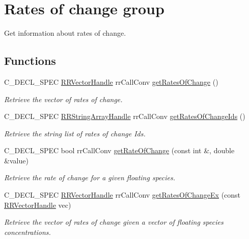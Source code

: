 \hypertarget{group__rate_of_change}{
\section{\-Rates of change group}
\label{group__rate_of_change}
}


\-Get information about rates of change.  


\subsection*{\-Functions}
\begin{DoxyCompactItemize}
\item 
\-C\-\_\-\-D\-E\-C\-L\-\_\-\-S\-P\-E\-C \hyperlink{rr__c__types_8h_aea46a16752b0ae2cd95c009030ee630e}{\-R\-R\-Vector\-Handle} \*
rr\-Call\-Conv \hyperlink{group__rate_of_change_gabbe129bee63761f7b0f98f060b86067b}{get\-Rates\-Of\-Change} ()
\begin{DoxyCompactList}\small\item\em \-Retrieve the vector of rates of change. \end{DoxyCompactList}\item 
\-C\-\_\-\-D\-E\-C\-L\-\_\-\-S\-P\-E\-C \*
\hyperlink{rr__c__types_8h_a90941a6a2247bf7a8ec3d429729c5f9a}{\-R\-R\-String\-Array\-Handle} rr\-Call\-Conv \hyperlink{group__rate_of_change_ga1a87e2a6db4adb19a11a6a893eca74d8}{get\-Rates\-Of\-Change\-Ids} ()
\begin{DoxyCompactList}\small\item\em \-Retrieve the string list of rates of change \-Ids. \end{DoxyCompactList}\item 
\-C\-\_\-\-D\-E\-C\-L\-\_\-\-S\-P\-E\-C bool rr\-Call\-Conv \hyperlink{group__rate_of_change_gaad38321993112e230f7fccd96345de6c}{get\-Rate\-Of\-Change} (const int \&, double \&value)
\begin{DoxyCompactList}\small\item\em \-Retrieve the rate of change for a given floating species. \end{DoxyCompactList}\item 
\-C\-\_\-\-D\-E\-C\-L\-\_\-\-S\-P\-E\-C \hyperlink{rr__c__types_8h_aea46a16752b0ae2cd95c009030ee630e}{\-R\-R\-Vector\-Handle} \*
rr\-Call\-Conv \hyperlink{group__rate_of_change_gacfae48e32754e7678b8bb003df93ef53}{get\-Rates\-Of\-Change\-Ex} (const \hyperlink{rr__c__types_8h_aea46a16752b0ae2cd95c009030ee630e}{\-R\-R\-Vector\-Handle} vec)
\begin{DoxyCompactList}\small\item\em \-Retrieve the vector of rates of change given a vector of floating species concentrations. \end{DoxyCompactList}\end{DoxyCompactItemize}


